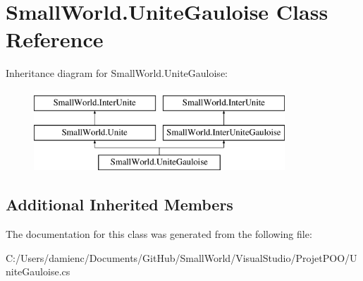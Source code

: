 \hypertarget{class_small_world_1_1_unite_gauloise}{\section{Small\-World.\-Unite\-Gauloise Class Reference}
\label{class_small_world_1_1_unite_gauloise}
}
Inheritance diagram for Small\-World.\-Unite\-Gauloise\-:\begin{figure}[H]
\begin{center}
\leavevmode
\includegraphics[height=3.000000cm]{class_small_world_1_1_unite_gauloise}
\end{center}
\end{figure}
\subsection*{Additional Inherited Members}


The documentation for this class was generated from the following file\-:\begin{DoxyCompactItemize}
\item 
C\-:/\-Users/damienc/\-Documents/\-Git\-Hub/\-Small\-World/\-Visual\-Studio/\-Projet\-P\-O\-O/Unite\-Gauloise.\-cs\end{DoxyCompactItemize}
